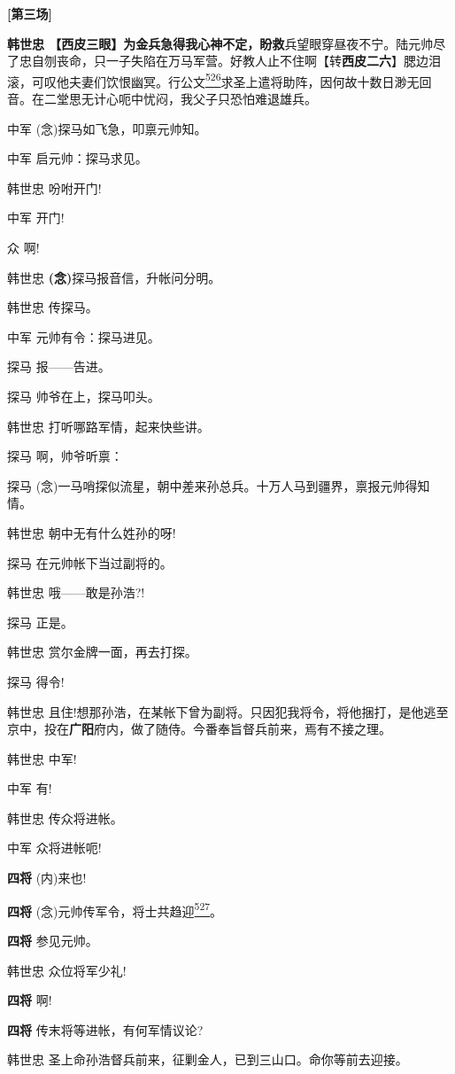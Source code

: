\textbf{{[}第三场{]}}

\textbf{韩世忠
【西皮三眼】为金兵急得我心神不定，盼救}兵望眼穿昼夜不宁。陆元帅尽了忠自刎丧命，只一子失陷在万马军营。好教人止不住啊【转\textbf{西皮二六}】腮边泪滚，可叹他夫妻们饮恨幽冥。行公文\protect\hyperlink{fn526}{\textsuperscript{526}}求圣上遣将助阵，因何故十数日渺无回音。在二堂思无计心呃中忧闷，我父子只恐怕难退雄兵。

中军 (念)探马如飞急，叩禀元帅知。

中军 启元帅：探马求见。

韩世忠 吩咐开门!

中军 开门!

众 啊!

韩世忠 \textbf{(念)}探马报音信，升帐问分明。

韩世忠 传探马。

中军 元帅有令：探马进见。

探马 报------告进。

探马 帅爷在上，探马叩头。

韩世忠 打听哪路军情，起来快些讲。

探马 啊，帅爷听禀：

探马
(念)一马哨探似流星，朝中差来孙总兵。十万人马到疆界，禀报元帅得知情。

韩世忠 朝中无有什么姓孙的呀!

探马 在元帅帐下当过副将的。

韩世忠 哦------敢是孙浩?!

探马 正是。

韩世忠 赏尔金牌一面，再去打探。

探马 得令!

韩世忠
且住!想那孙浩，在某帐下曾为副将。只因犯我将令，将他捆打，是他逃至京中，投在\textbf{广阳}府内，做了随侍。今番奉旨督兵前来，焉有不接之理。

韩世忠 中军!

中军 有!

韩世忠 传众将进帐。

中军 众将进帐呃!

\textbf{四将} (内)来也!

\textbf{四将}
(念)元帅传军令，将士共趋迎\protect\hyperlink{fn527}{\textsuperscript{527}}。

\textbf{四将} 参见元帅。

韩世忠 众位将军少礼!

\textbf{四将} 啊!

\textbf{四将} 传末将等进帐，有何军情议论?

韩世忠 圣上命孙浩督兵前来，征剿金人，已到三山口。命你等前去迎接。

